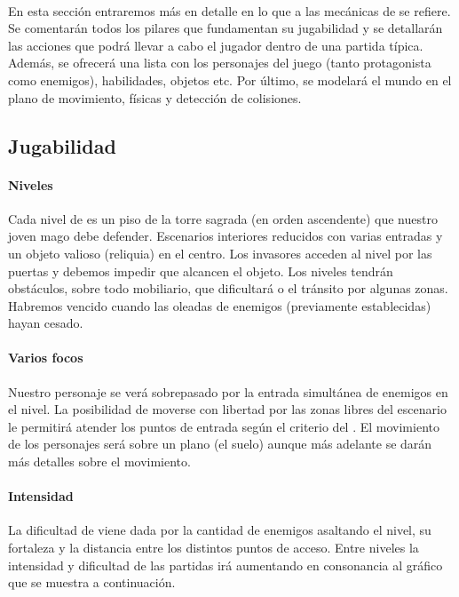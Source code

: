 \paragraph{}
En esta sección entraremos más en detalle en lo que a las mecánicas de
\juego se refiere. Se comentarán todos los pilares que fundamentan su
jugabilidad y se detallarán las acciones que podrá llevar a cabo el jugador
dentro de una partida típica. Además, se ofrecerá una lista con los personajes
del juego (tanto protagonista como enemigos), habilidades, objetos etc.
Por último, se modelará el mundo en el plano de movimiento, físicas y
detección de colisiones.


\subsection{Jugabilidad}
\label{sec:mec-jugabilidad}

\paragraph{Niveles}
Cada nivel de \juego es un piso de la torre sagrada (en orden ascendente)
que nuestro joven mago debe defender. Escenarios interiores
reducidos con varias entradas y un objeto valioso (reliquia) en el centro.
Los invasores acceden al nivel por las puertas y debemos impedir que alcancen
el objeto. Los niveles tendrán obstáculos, sobre todo mobiliario,
que dificultará o el tránsito por algunas zonas. Habremos vencido cuando
las oleadas de enemigos (previamente establecidas) hayan cesado.

\paragraph{Varios focos}
Nuestro personaje se verá sobrepasado por la entrada simultánea de enemigos
en el nivel. La posibilidad de moverse con libertad por las zonas libres
del escenario le permitirá atender los puntos de entrada según el criterio
del \jugador. El movimiento de los personajes será sobre un plano (el suelo)
aunque más adelante se darán más detalles sobre el movimiento.

\paragraph{Intensidad}
La dificultad de \juego viene dada por la cantidad de enemigos asaltando
el nivel, su fortaleza y la distancia entre los distintos puntos de acceso.
Entre niveles la intensidad y dificultad de las partidas irá aumentando en
consonancia al gráfico que se muestra a continuación.


